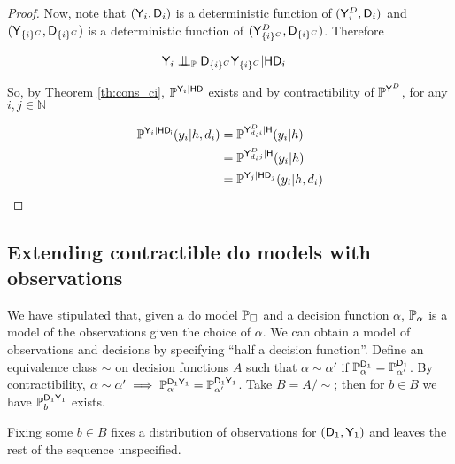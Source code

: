 \begin{proof}
Now, note that $(\mathsf{Y}_i,\mathsf{D}_i)$ is a deterministic function of $(\mathsf{Y}^D_{i},\mathsf{D}_i)$ and $(\mathsf{Y}_{\{i\}^C},\mathsf{D}_{\{i\}^C})$ is a deterministic function of $(\mathsf{Y}^D_{\{i\}^C},\mathsf{D}_{\{i\}^C})$. Therefore

\begin{align}
    &\RV{Y}_i \CI_{\prob{P}} \RV{D}_{\{i\}^C}\RV{Y}_{\{i\}^C} |\RV{H}\RV{D}_i&
\end{align}

So, by Theorem \ref{th:cons_ci}, $\mathbb{P}^{\mathsf{Y}_i|\mathsf{HD}}$ exists and by contractibility of $\mathbb{P}^{\mathsf{Y}^D}$, for any $i,j\in\mathbb{N}$

\begin{align}
    \mathbb{P}^{\mathsf{Y}_i|\mathsf{HD_i}}(y_i|h,d_i) &= \mathbb{P}^{\mathsf{Y}^D_{d_i i}|\mathsf{H}}(y_i|h) \\
    &= \mathbb{P}^{\mathsf{Y}^D_{d_i j}|\mathsf{H}}(y_i|h)\\
    &= \mathbb{P}^{\mathsf{Y}_j|\mathsf{HD}_j}(y_i|h,d_i)
\end{align}
\end{proof}

\subsection{Extending contractible do models with observations}

We have stipulated that, given a do model $\mathbb{P}_\square$ and a decision function $\alpha$, $\mathbb{P}_\alpha$ is a model of the observations given the choice of $\alpha$. We can obtain a model of observations and decisions by specifying ``half a decision function''. Define an equivalence class $\sim$ on decision functions $A$ such that $\alpha\sim\alpha'$ if $\mathbb{P}_\alpha^{\mathsf{D}_1}=\mathbb{P}_{\alpha'}^{\mathsf{D}_1}$. By contractibility, $\alpha\sim\alpha'\implies \mathbb{P}_\alpha^{\mathsf{D}_1\mathsf{Y}_1}=\mathbb{P}_{\alpha'}^{\mathsf{D}_1\mathsf{Y}_1}$. Take $B=A/\sim$; then for $b\in B$ we have $\mathbb{P}_b^{\mathsf{D}_1\mathsf{Y}_1}$ exists.

Fixing some $b\in B$ fixes a distribution of observations for $(\mathsf{D}_1,\mathsf{Y}_1)$ and leaves the rest of the sequence unspecified.

